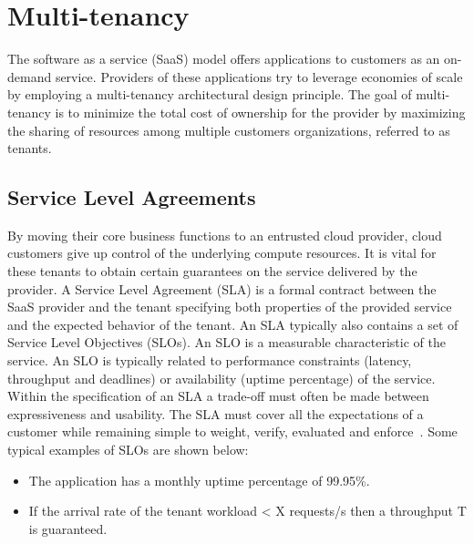 \section{Multi-tenancy}
\label{multi-tenancy}
The software as a service (SaaS) model offers applications to customers as an on-demand service. Providers of these applications try to leverage economies of scale by employing a multi-tenancy architectural design principle. The goal of multi-tenancy is to minimize the total cost of ownership for the provider by maximizing the sharing of resources among multiple customers organizations, referred to as tenants.~\cite{Walraven2015b} 
\subsection{Service Level Agreements}
By moving their core business functions to an entrusted cloud provider, cloud customers give up control of the underlying compute resources. It is vital for these tenants to obtain certain guarantees on the service delivered by the provider. 
A Service Level Agreement (SLA) is a formal contract between the SaaS provider and the tenant specifying both properties of the provided service and the expected behavior of the tenant. An SLA typically also contains a set of Service Level Objectives (SLOs). An SLO is a measurable characteristic of the service. An SLO is typically related to performance constraints (latency, throughput and deadlines) or availability (uptime percentage) of the service. Within the specification of an SLA a trade-off must often be made between expressiveness and usability. The SLA must cover all the expectations of a customer while remaining simple to weight, verify, evaluated and enforce~\cite{dillon2010cloud}.  Some typical examples of SLOs are shown below: 
\begin{itemize}
\item The application has a monthly uptime percentage of 99.95\%.
\item If the arrival rate of the tenant workload < X requests/s then a throughput T is guaranteed.
\end{itemize}
